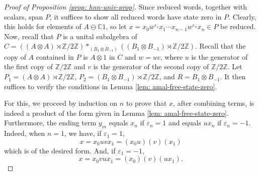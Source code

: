 \documentclass[10pt,a4paper]{amsart}
\newcommand{\Z}{\mathbb{Z}}
\begin{document}
\begin{proof}[Proof of Proposition \ref{prop: hnn-univ-prop}]
    Since reduced words, together with scalars, span $P$, it suffices to show all reduced words have state zero in $P$. Clearly, this holds for elements of $A \ominus \mathbb{C}1$, so let $x = x_0w^{\varepsilon_1}x_1\cdots x_{n-1}w^{\varepsilon_n}x_n \in P$ be reduced. Now, recall that $P$ is a unital subalgebra of $C = ((A\otimes A)\rtimes \Z/2\Z) *_{(B_1\otimes B_{-1})}((B_1\otimes B_{-1})\rtimes \Z/2\Z)$. Recall that the copy of $A$ contained in $P$ is $A \otimes 1$ in $C$ and $w = uv$, where $u$ is the generator of the first copy of $\Z/2\Z$ and $v$ is the generator of the second copy of $\Z/2\Z$. Let $P_1 = (A\otimes A)\rtimes \Z/2\Z$, $P_2 = (B_1\otimes B_{-1})\rtimes \Z/2\Z$, and $R = B_1\otimes B_{-1}$. It then suffices to verify the conditions in Lemma \ref{lem: amal-free-state-zero}.

    For this, we proceed by induction on $n$ to prove that $x$, after combining terms, is indeed a product of the form given in Lemma \ref{lem: amal-free-state-zero}. Furthermore, the ending term $y_m$ equals $x_n$ if $\varepsilon_n = 1$ and equals $ux_n$ if $\varepsilon_n = -1$. Indeed, when $n = 1$, we have, if $\varepsilon_1 = 1$,
    \begin{equation*}
        x = x_0uvx_1 = (x_0u)(v)(x_1)
    \end{equation*}
    which is of the desired form. And, if $\varepsilon_1 = -1$,
    \begin{equation*}
        x = x_0vux_1 = (x_0)(v)(ux_1).
    \end{equation*}


\end{proof}
\end{document}
